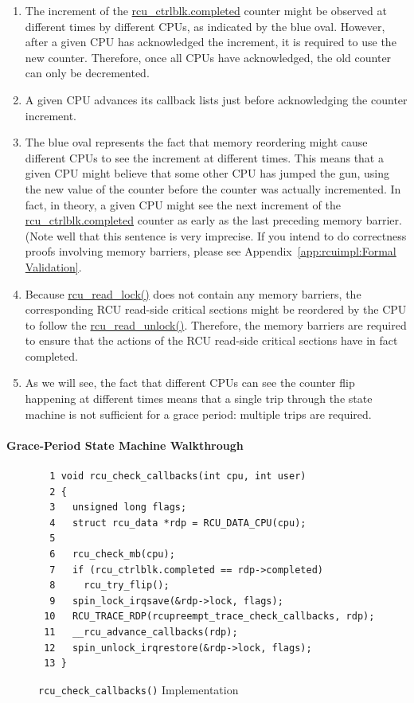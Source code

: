\begin{enumerate}
\item	The increment of the \url{rcu_ctrlblk.completed} counter
	might be observed at different times by different CPUs, as
	indicated by the blue oval.  However, after a given
	CPU has acknowledged the increment, it is required to
	use the new counter.
	Therefore, once all CPUs have acknowledged, the old counter
	can only be decremented.
\item	A given CPU advances its callback lists just before
	acknowledging the counter increment.
\item	The blue oval represents the fact that memory reordering
	might cause different CPUs to see the increment at
	different times.
	This means that a given CPU might believe that some
	other CPU has jumped the gun, using the new value of the counter
	before the counter was actually incremented.
	In fact, in theory, a given CPU might see the next increment of the
	\url{rcu_ctrlblk.completed} counter as early as
	the last preceding memory barrier.
	(Note well that this sentence is very imprecise.
	If you intend to do correctness proofs involving memory barriers,
	please see Appendix~\ref{app:rcuimpl:Formal Validation}.
\item	Because \url{rcu_read_lock()} does not contain any
	memory barriers, the corresponding RCU read-side critical
	sections might be reordered by the CPU to follow the
	\url{rcu_read_unlock()}.
	Therefore, the memory barriers are required to ensure
	that the actions of the RCU read-side critical sections
	have in fact completed.
\item	As we will see, the fact that different CPUs can see the
	counter flip happening at different times means that a
	single trip through the state machine is not sufficient
	for a grace period: multiple trips are required.
\end{enumerate}

\paragraph{Grace-Period State Machine Walkthrough}
\label{app:rcuimpl:Grace-Period State Machine Walkthrough}

\begin{figure}[tbp]
{ \scriptsize
\begin{verbatim}
  1 void rcu_check_callbacks(int cpu, int user)
  2 {
  3   unsigned long flags;
  4   struct rcu_data *rdp = RCU_DATA_CPU(cpu);
  5
  6   rcu_check_mb(cpu);
  7   if (rcu_ctrlblk.completed == rdp->completed)
  8     rcu_try_flip();
  9   spin_lock_irqsave(&rdp->lock, flags);
 10   RCU_TRACE_RDP(rcupreempt_trace_check_callbacks, rdp);
 11   __rcu_advance_callbacks(rdp);
 12   spin_unlock_irqrestore(&rdp->lock, flags);
 13 }
\end{verbatim}
}
\caption{{\tt rcu\_check\_callbacks()} Implementation}
\label{fig:app:rcuimpl:rcu_check_callbacks() Implementation}
\end{figure}

